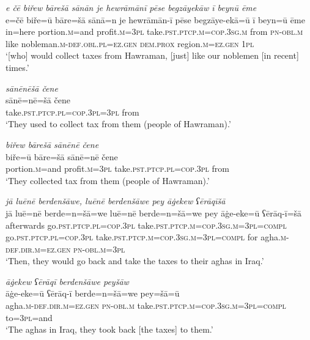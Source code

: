 \ea \label{BP.24}
\textit{e čē biřew bārešā sānān je hewrāmānī pēse begzāyekāw ī beynū ēme} \\ 
\gll e=čē biře=ū bāre=šā sānā=n je hewrāmān-ī pēse begzāye-ekā=ū ī beyn=ū ēme \\ 
 in=here portion\textsc{.m}=and profit\textsc{.m}\textsc{=3pl} take\textsc{.pst}\textsc{.ptcp}\textsc{.m}\textsc{=cop}\textsc{.3sg}\textsc{.m} from \textsc{pn}\textsc{-obl}\textsc{.m} like nobleman\textsc{.m}\textsc{-def}\textsc{.obl}\textsc{.pl}\textsc{=ez.gen} \textsc{dem.prox} region\textsc{.m}\textsc{=ez.gen} \textsc{1pl} \\ 
\glt `[who] would collect taxes from Hawraman, [just] like our noblemen [in recent] times.'
\z 
 
\ea \label{BP.25}
\textit{sānēnēšā čene} \\ 
\gll sānē=nē=šā čene \\ 
 take\textsc{.pst}\textsc{.ptcp}\textsc{.pl}\textsc{=cop}\textsc{.3pl}\textsc{=3pl} from \\ 
\glt `They used to collect tax from them (people of Hawraman).'
\z 
 
\ea \label{BP.26}
\textit{biřew bārešā sānēnē čene} \\ 
\gll biře=ū bāre=šā sānē=nē čene \\ 
 portion\textsc{.m}=and profit\textsc{.m}\textsc{=3pl} take\textsc{.pst}\textsc{.ptcp}\textsc{.pl}\textsc{=cop}\textsc{.3pl} from \\ 
\glt `They collected tax from them (people of Hawraman).'
\z 
 
\ea \label{BP.27}
\textit{jā luēnē berdenšāwe, luēnē berdenšāwe pey āġekew ʕērāqīšā} \\ 
\gll jā luē=nē berde=n=šā=we luē=nē berde=n=šā=we pey āġe-eke=ū ʕērāq-ī=šā \\ 
 afterwards go\textsc{.pst}\textsc{.ptcp}\textsc{.pl}\textsc{=cop}\textsc{.3pl} take\textsc{.pst}\textsc{.ptcp}\textsc{.m}\textsc{=cop}\textsc{.3sg}\textsc{.m}\textsc{=3pl}\textsc{=compl} go\textsc{.pst}\textsc{.ptcp}\textsc{.pl}\textsc{=cop}\textsc{.3pl} take\textsc{.pst}\textsc{.ptcp}\textsc{.m}\textsc{=cop}\textsc{.3sg}\textsc{.m}\textsc{=3pl}\textsc{=compl} for agha\textsc{.m}\textsc{-def}\textsc{.dir}\textsc{.m}\textsc{=ez.gen} \textsc{pn}\textsc{-obl}\textsc{.m}\textsc{=3pl} \\ 
\glt `Then, they would go back and take the taxes to their aghas in Iraq.'
\z 
 
\ea \label{BP.28}
\textit{āġekew ʕērāqī berdenšāwe peyšāw} \\ 
\gll āġe-eke=ū ʕērāq-ī berde=n=šā=we pey=šā=ū \\ 
 agha\textsc{.m}\textsc{-def}\textsc{.dir}\textsc{.m}\textsc{=ez.gen} \textsc{pn}\textsc{-obl}\textsc{.m} take\textsc{.pst}\textsc{.ptcp}\textsc{.m}\textsc{=cop}\textsc{.3sg}\textsc{.m}\textsc{=3pl}\textsc{=compl} to\textsc{=3pl}=and \\ 
\glt `The aghas in Iraq, they took back [the taxes] to them.'
\z 
 
